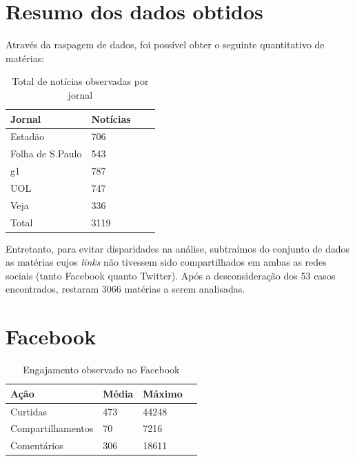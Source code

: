 \documentclass[
	12pt,
	oneside,
	a4paper,
	english,
	brazil
]{abntex2ppgsi}
\begin{document}
\section{Resumo dos dados obtidos}
Através da raspagem de dados, foi possível obter o seguinte quantitativo de matérias:

\begin{table}[H]
	\centering
	\caption{Total de notícias observadas por jornal}
		\begin{tabular}{p{2in} p{1in} p{1in} p{1in} } \hline

		Jornal & Notícias \\ \hline
		Estadão	& 706 \\ 
		Folha de S.Paulo & 543 \\ 
		g1	& 787 \\ 
		UOL	& 747 \\
		Veja & 336 \\ \hline
        Total & 3119 \\ \hline
		
		\end{tabular}
	\label{tab:total-noticias}
\end{table}

Entretanto, para evitar disparidades na análise, subtraímos do conjunto de dados as matérias cujos \textit{links} não tivessem sido compartilhados em ambas as redes sociais (tanto Facebook quanto Twitter). Após a desconsideração dos 53 casos encontrados, restaram 3066 matérias a serem analisadas.

\section{Facebook}

\begin{table}[H]
	\centering
	\caption{Engajamento observado no Facebook}
		\begin{tabular}{p{2in} p{1in} p{1in} p{1in} } \hline

		Ação              & Média & Máximo \\ \hline
		Curtidas	      & 473   & 44248 \\ 
		Compartilhamentos & 70    & 7216 \\ 
		Comentários       & 306   & 18611 \\ \hline
		
		\end{tabular}
	\label{tab:engajamento-facebook}
\end{table}
\end{document}
